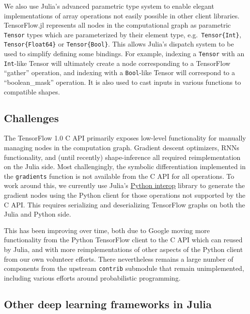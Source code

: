 \documentclass{book}
\begin{document}
We also use Julia's advanced parametric type system to enable elegant
implementations of array operations not easily possible in other client
libraries. TensorFlow.jl represents all nodes in the computational graph
as parametric \texttt{Tensor} types which are parameterized by their
element type, e.g.~\texttt{Tensor\{Int\}}, \texttt{Tensor\{Float64\}} or
\texttt{Tensor\{Bool\}}. This allows Julia's dispatch system to be used
to simplify defining some bindings. For example, indexing a
\texttt{Tensor} with an \texttt{Int}-like Tensor will ultimately create
a node corresponding to a TensorFlow ``gather'' operation, and indexing
with a \texttt{Bool}-like Tensor will correspond to a ``boolean\_mask''
operation. It is also used to cast inputs in various functions to
compatible shapes.

\hypertarget{challenges}{%
	\subsection{Challenges}\label{challenges}}

The TensorFlow 1.0 C API primarily exposes low-level functionality for
manually managing nodes in the computation graph. Gradient descent
optimizers, RNNs functionality, and (until recently) shape-inference all
required reimplementation on the Julia side. Most challengingly, the
symbolic differentiation implemented in the \texttt{gradients} function
is not available from the C API for all operations. To work around this,
we currently use Julia's
\href{https://github.com/JuliaPy/PyCall.jl}{Python interop} library to
generate the gradient nodes using the Python client for those operations
not supported by the C API. This requires serializing and deserializing
TensorFlow graphs on both the Julia and Python side.

This has been improving over time, both due to Google moving more
functionality from the Python TensorFlow client to the C API which can
reused by Julia, and with more reimplementations of other aspects of the
Python client from our own volunteer efforts. There nevertheless remains
a large number of components from the upstream \texttt{contrib}
submodule that remain unimplemented, including various efforts around
probabilistic programming.

\hypertarget{other-deep-learning-frameworks-in-julia}{%
\subsection{Other deep learning frameworks in
		Julia}\label{other-deep-learning-frameworks-in-julia}}
\end{document}
